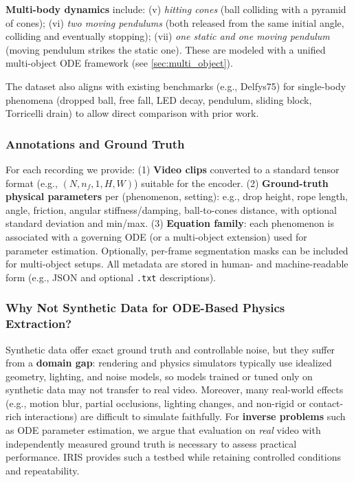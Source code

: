 \textbf{Multi-body dynamics} include: (v) \emph{hitting cones} (ball colliding with a pyramid of cones); (vi) \emph{two moving pendulums} (both released from the same initial angle, colliding and eventually stopping); (vii) \emph{one static and one moving pendulum} (moving pendulum strikes the static one). These are modeled with a unified multi-object ODE framework (see \ref{sec:multi_object}).

The dataset also aligns with existing benchmarks (e.g., Delfys75) for single-body phenomena (dropped ball, free fall, LED decay, pendulum, sliding block, Torricelli drain) to allow direct comparison with prior work.

\subsubsection{Annotations and Ground Truth}
\label{sec:dataset_annotations}

For each recording we provide: (1) \textbf{Video clips} converted to a standard tensor format (e.g., $(N, n_f, 1, H, W)$) suitable for the encoder. (2) \textbf{Ground-truth physical parameters} per (phenomenon, setting): e.g., drop height, rope length, angle, friction, angular stiffness/damping, ball-to-cones distance, with optional standard deviation and min/max. (3) \textbf{Equation family}: each phenomenon is associated with a governing ODE (or a multi-object extension) used for parameter estimation. Optionally, per-frame segmentation masks can be included for multi-object setups. All metadata are stored in human- and machine-readable form (e.g., JSON and optional \texttt{.txt} descriptions).

\subsubsection{Why Not Synthetic Data for ODE-Based Physics Extraction?}
\label{sec:why_real}

Synthetic data offer exact ground truth and controllable noise, but they suffer from a \textbf{domain gap}: rendering and physics simulators typically use idealized geometry, lighting, and noise models, so models trained or tuned only on synthetic data may not transfer to real video. Moreover, many real-world effects (e.g., motion blur, partial occlusions, lighting changes, and non-rigid or contact-rich interactions) are difficult to simulate faithfully. For \textbf{inverse problems} such as ODE parameter estimation, we argue that evaluation on \emph{real} video with independently measured ground truth is necessary to assess practical performance. IRIS provides such a testbed while retaining controlled conditions and repeatability.

